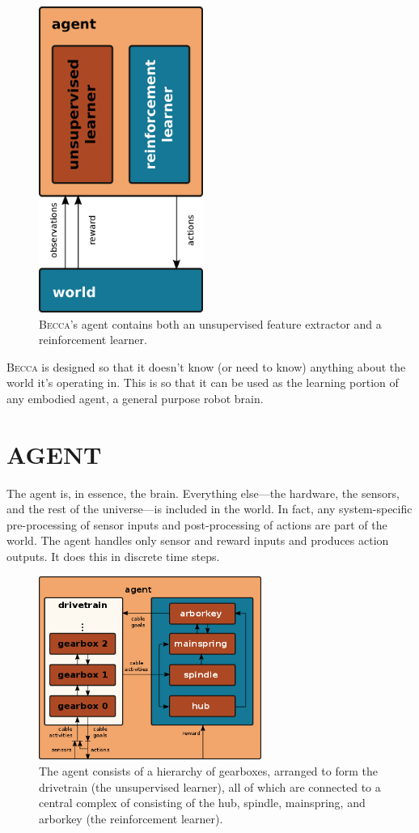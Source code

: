 \documentclass[oneside,twocolumn]{article}
\begin{document}
\begin{figure}[ht]
\centering
\includegraphics[height=10.0cm]{figs/learners.png}
\caption{\textsc{Becca}'s agent contains both an unsupervised feature extractor and a reinforcement learner.}
\label{learners}
\end{figure}

\textsc{Becca} is designed so that it doesn't know (or need to know) anything about the world it's operating in. This is so that it can be used as the learning portion of any embodied agent, a general purpose robot brain.

\section*{\color{copper} AGENT}

The agent is, in essence, the brain. Everything else---the hardware, the sensors, and the rest of the universe---is included in the world. In fact, any system-specific pre-processing of sensor inputs and post-processing of actions are part of the world. The agent handles only sensor and reward inputs and produces action outputs. It does this in discrete time steps.  

\begin{figure}[ht]
\centering
\includegraphics[height=6.0cm]{figs/agent.png}
\caption{The agent consists of a hierarchy of gearboxes, arranged to form the drivetrain (the unsupervised learner), all of which are connected to a central complex of consisting of the hub, spindle, mainspring, and arborkey (the reinforcement learner).}
\label{agent}
\end{figure}
\end{document}
